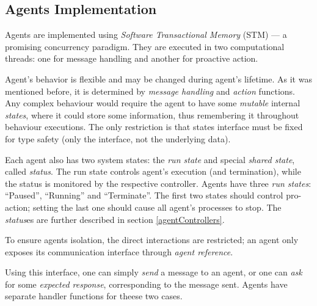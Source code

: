 \subsection{Agents Implementation}

Agents are implemented using \emph{Software Transactional Memory} (STM)
\cite{STMCode07} --- a promising concurrency paradigm.
They are executed in two computational threads:
one for message handling and another for proactive action.

\medskip

\noindent
Agent's behavior is flexible and may be changed during agent's lifetime.
As it was mentioned before, it is determined by \emph{message handling} and
\emph{action} functions.
Any complex behaviour would require the agent to have some \emph{mutable}
internal \emph{states}, where it could store some information,
thus remembering it throughout behaviour executions.
The only restriction is that states interface must be fixed for type safety
(only the interface, not the underlying data).


Each agent also has two system states: the \emph{run state} and special \emph{shared
  state}, called \emph{status}. The run state controls agent's execution
(and termination), while the status is monitored by the respective controller.
Agents have three \emph{run states}: ``Paused'', ``Running'' and ``Terminate''.
The first two states should control pro-action;
setting the last one should cause all agent's processes to stop.
The \emph{status}es are further described in section \ref{agentControllers}.

\medskip

To ensure agents isolation, the direct interactions are restricted;
an agent only exposes its communication interface through \emph{agent reference}.

Using this interface, one can simply \emph{send} a message to an agent,
or one can \emph{ask} for some \emph{expected response}, corresponding to the message sent.
Agents have separate handler functions for theese two cases.



